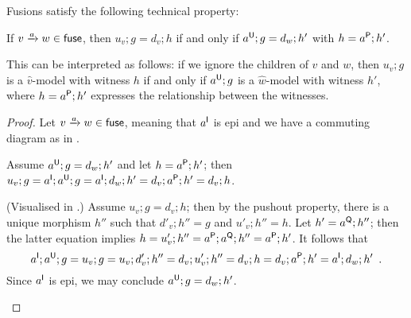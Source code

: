 Fusions satisfy the following technical property:
%
\begin{lemma}\label{lem:fusion}
If $\trip vaw\in\fuse$, then $u_v;g=d_v;h$ if and only if $a\U;g=d_w;h'$ with $h=a\P;h'$.
\end{lemma}
%
This can be interpreted as follows: if we ignore the children of $v$ and $w$, then $u_v;g$ is a $\hat v$-model with witness $h$ if and only if $a\U;g$ is a $\hat w$-model with witness $h'$, where $h=a\P;h'$ expresses the relationship between the witnesses.
%
\begin{proof} Let $\trip vaw\in\fuse$, meaning that $a\I$ is epi and we have a commuting diagram as in .
\begin{description}[topsep=\itemsep]
\item[If.] Assume $a\U;g=d_w;h'$ and let $h=a\P;h'$; then $u_v;g=a\I;a\U;g=a\I;d_w;h'=d_v;a\P;h'=d_v;h$.
\item[Only if.] (Visualised in .) Assume $u_v;g=d_v;h$; then by the pushout property, there is a unique morphism $h''$ such that $d'_v;h''=g$ and $u'_v;h''=h$. Let $h'=a\Q;h''$; then the latter equation implies $h=u'_v;h''=a\P;a\Q;h''=a\P;h'$. It follows that
\[ a\I;a\U;g=u_v;g=u_v;d'_v;h''=d_v;u'_v;h''=d_v;h=d_v;a\P;h'=a\I;d_w;h' \enspace. \]
Since $a\I$ is epi, we may conclude $a\U;g=d_w;h'$.
\end{description}
\end{proof}


